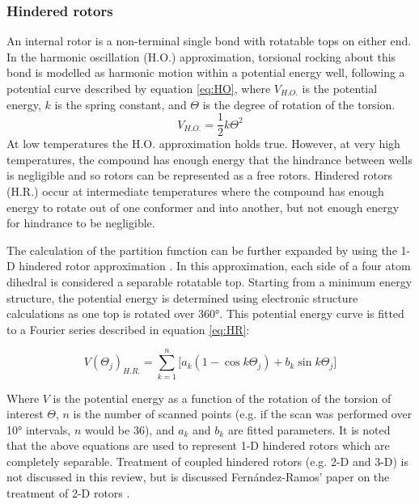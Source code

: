 \documentclass[preprint, 11pt]{elsarticle} %
\begin{document}
\subsubsection{Hindered rotors}
An internal rotor is a non-terminal single bond with rotatable tops on either end. 
In the harmonic oscillation (H.O.) approximation, torsional rocking about this bond is modelled as harmonic motion within a potential energy well, following a potential curve described by equation \ref{eq:HO}, where $V_{H.O.}$ is the potential energy, $k$ is the spring constant, and $\Theta$ is the degree of rotation of the torsion.
\begin{equation}
    V_{H.O.} = \frac{1}{2} k \Theta^2
    \label{eq:HO}
\end{equation}
At low temperatures the H.O. approximation holds true. However, at very high temperatures, the compound has enough energy that the hindrance between wells is negligible and so rotors can be represented as a free rotors. 
Hindered rotors (H.R.) occur at intermediate temperatures where the compound has enough energy to rotate out of one conformer and into another, but not enough energy for hindrance to be negligible.

The calculation of the partition function can be further expanded by using the 1-D hindered rotor approximation \cite{pfaendtner:2007}.
In this approximation, each side of a four atom dihedral is considered a separable rotatable top.
Starting from a minimum energy structure, the potential energy is determined using electronic structure calculations as one top is rotated over \ang{360}. 
This potential energy curve is fitted to a Fourier series described in equation \ref{eq:HR}:

\begin{equation}
    V(\Theta_j)_{H.R.} = \sum^{n}_{k=1} \Big[ a_k (1 - \cos{k \Theta_j}) + b_k \sin{k \Theta_j} \Big]
    \label{eq:HR}
\end{equation}

Where $V$ is the potential energy as a function of the rotation of the torsion of interest $\Theta$, $n$ is the number of scanned points (e.g. if the scan was performed over \ang{10} intervals, $n$ would be 36), and $a_k$ and $b_k$ are fitted parameters.
It is noted that the above equations are used to represent 1-D hindered rotors which are completely separable.
Treatment of coupled hindered rotors (e.g. 2-D and 3-D) is not discussed in this review, but is discussed Fern\'andez-Ramos' paper on the treatment of 2-D rotors \cite{fernandez:2013}.
\end{document}
